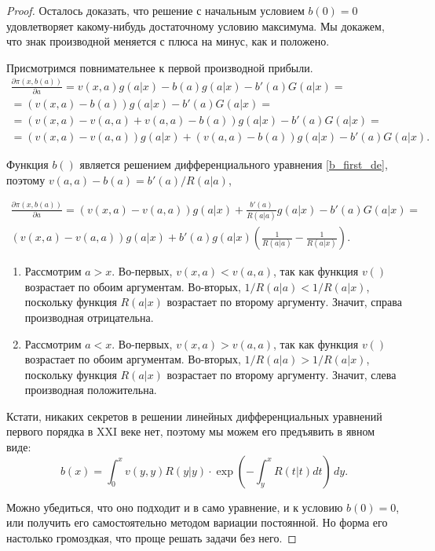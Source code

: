 \begin{itemize}
\begin{proof}
Осталось доказать, что решение с начальным условием $ b(0)=0 $ удовлетворяет какому-нибудь достаточному условию максимума. Мы докажем, что знак производной меняется с плюса на минус, как и положено.


Присмотримся повнимательнее к первой производной прибыли.
\begin{multline}
\frac{\partial \pi(x,b(a))}{\partial a}=v(x,a)g(a|x)-b(a)g(a|x)-b'(a)G(a|x)=\\
=(v(x,a)-b(a))g(a|x)-b'(a)G(a|x)=\\
=(v(x,a)-v(a,a)+v(a,a)-b(a))g(a|x)-b'(a)G(a|x)=\\
=(v(x,a)-v(a,a))g(a|x)+(v(a,a)-b(a))g(a|x)-b'(a)G(a|x).
\end{multline}

Функция $ b() $ является решением дифференциального уравнения \ref{b_first_de}, поэтому $ v(a,a)-b(a)=b'(a)/R(a|a) $,

\begin{multline}
\frac{\partial \pi(x,b(a))}{\partial a}=(v(x,a)-v(a,a))g(a|x)+\frac{b'(a)}{R(a|a)}g(a|x)-b'(a)G(a|x)=\\
(v(x,a)-v(a,a))g(a|x)+b'(a)g(a|x)\left(\frac{1}{R(a|a)}-\frac{1}{R(a|x)} \right).
\end{multline}

\begin{enumerate}
\item Рассмотрим $ a>x $. Во-первых, $ v(x,a)<v(a,a) $, так как функция $ v() $ возрастает по обоим аргументам. Во-вторых, $1/R(a|a)<1/R(a|x) $, поскольку функция $ R(a|x) $ возрастает по второму аргументу. Значит, справа производная отрицательна.
\item Рассмотрим $ a<x $. Во-первых, $ v(x,a)>v(a,a) $, так как функция $ v() $ возрастает по обоим аргументам. Во-вторых, $1/R(a|a)>1/R(a|x) $, поскольку функция $ R(a|x) $ возрастает по второму аргументу. Значит, слева производная положительна.
\end{enumerate}

Кстати, никаких секретов в решении линейных дифференциальных уравнений первого порядка в XXI веке нет, поэтому мы можем его предъявить в явном виде:
\begin{equation}
b(x)=\int_{0}^{x}v(y,y)R(y|y)\cdot \exp\left(-\int_{y}^{x}R(t|t)dt\right) \, dy.
\end{equation}

Можно убедиться, что оно подходит и в само уравнение, и к условию $ b(0)=0 $, или получить его самостоятельно методом вариации постоянной. Но форма его настолько громоздкая, что проще решать задачи без него.
\end{proof}


\end{itemize}
